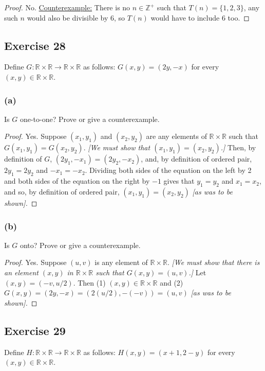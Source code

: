 \documentclass[14pt]{extarticle}
\newcommand{\R}{\mathbb{R}}
\newcommand{\Z}{\mathbb{Z}}
\begin{document}
\begin{proof}
No. \underline{Counterexample:} There is no \(n \in \Z^+\) such that \(T(n) = \{1, 2, 3\}\), any such $n$ would also 
be divisible by 6, so \(T(n)\) would have to include 6 too.
\end{proof}

\subsection{Exercise 28}
Define \(G: \R \times \R \to \R \times \R\) as follows: \(G(x, y) = (2y, -x)\) for every \((x, y) \in \R \times \R\).

\subsubsection{(a)}
Is $G$ one-to-one? Prove or give a counterexample.

\begin{proof}
Yes. Suppose \((x_1, y_1)\) and \((x_2, y_2)\) are any elements of \(\R \times \R\) such that \(G(x_1, y_1) = 
G(x_ 2, y_2)\). {\it [We must show that \((x_1, y_1) = (x_2, y_2)\).]} Then, by definition of $G$, \((2y_1, -x_1) 
= (2y_2, -x_2)\), and, by definition of ordered pair, \(2y_1 = 2y_2\) and \(-x_1 = -x_2\). Dividing both sides of 
the equation on the left by 2 and both sides of the equation on the right by $-1$ gives that \(y_1 = y_2\) and 
\(x_1 = x_2\), and so, by definition of ordered pair, \((x_1, y_1) = (x_2, y_2)\) {\it [as was to be shown].}
\end{proof}

\subsubsection{(b)}
Is $G$ onto? Prove or give a counterexample.

\begin{proof}
Yes. Suppose \((u, v)\) is any element of \(\R \times \R\). {\it [We must show that there is an element \((x, y)\) in 
\(\R \times \R\) such that \(G(x, y) = (u, v)\).]} Let \((x, y) = (-v, u/2)\). Then (1) \((x, y) \in \R \times \R\) 
and (2) \(G(x, y) = (2y, -x) = (2(u/2), -(-v)) = (u, v)\) {\it [as was to be shown].}
\end{proof}

\subsection{Exercise 29}
Define \(H: \R \times \R \to \R \times \R\) as follows: \(H(x, y) = (x+1, 2-y)\) for every \((x, y) \in \R \times \R\).
\end{document}
